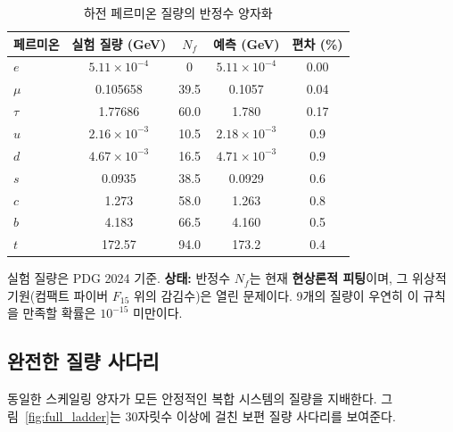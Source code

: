 \documentclass[12pt,a4paper]{article}
\begin{document}
	\begin{table}[htbp]
		\centering
		\caption{하전 페르미온 질량의 반정수 양자화}
		\label{tab:fermions}
		\begin{tabular}{l c c c c}
			\toprule
			페르미온 & 실험 질량 (GeV) & \(N_f\) & 예측 (GeV) & 편차 (\%) \\
			\midrule
			\(e\)   & \(5.11\times10^{-4}\) & 0      & \(5.11\times10^{-4}\) & 0.00 \\
			\(\mu\)  & 0.105658             & 39.5   & 0.1057               & 0.04 \\
			\(\tau\) & 1.77686              & 60.0   & 1.780                & 0.17 \\
			\(u\)   & \(2.16\times10^{-3}\) & 10.5   & \(2.18\times10^{-3}\) & 0.9 \\
			\(d\)   & \(4.67\times10^{-3}\) & 16.5   & \(4.71\times10^{-3}\) & 0.9 \\
			\(s\)   & 0.0935               & 38.5   & 0.0929               & 0.6 \\
			\(c\)   & 1.273                & 58.0   & 1.263                & 0.8 \\
			\(b\)   & 4.183                & 66.5   & 4.160                & 0.5 \\
			\(t\)   & 172.57               & 94.0   & 173.2                & 0.4 \\
			\bottomrule
		\end{tabular}
		\par\smallskip
		\footnotesize
		실험 질량은 PDG 2024 기준. \textbf{상태:} 반정수 \(N_f\)는 현재 \textbf{현상론적 피팅}이며, 그 위상적 기원(컴팩트 파이버 \(F_{15}\) 위의 감김수)은 열린 문제이다. 9개의 질량이 우연히 이 규칙을 만족할 확률은 \(10^{-15}\) 미만이다.
	\end{table}
	
	\subsection{완전한 질량 사다리}
	
	동일한 스케일링 양자가 모든 안정적인 복합 시스템의 질량을 지배한다. 그림~\ref{fig:full_ladder}는 30자릿수 이상에 걸친 보편 질량 사다리를 보여준다.
	
\end{document}
